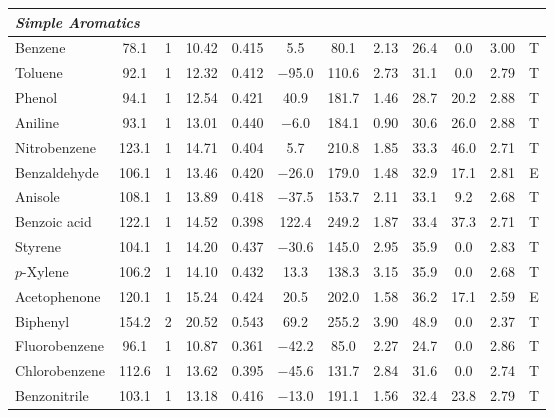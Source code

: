 \documentclass[12pt,a4paper]{article}
\begin{document}
\begin{small}
\begin{longtable}{@{}p{2.8cm}ccccccccccc@{}}
\multicolumn{12}{l}{\textit{\textbf{Simple Aromatics}}} \\
\midrule
Benzene & 78.1 & 1 & 10.42 & 0.415 & 5.5 & 80.1 & 2.13 & 26.4 & 0.0 & 3.00 & T \\
Toluene & 92.1 & 1 & 12.32 & 0.412 & $-$95.0 & 110.6 & 2.73 & 31.1 & 0.0 & 2.79 & T \\
Phenol & 94.1 & 1 & 12.54 & 0.421 & 40.9 & 181.7 & 1.46 & 28.7 & 20.2 & 2.88 & T \\
Aniline & 93.1 & 1 & 13.01 & 0.440 & $-$6.0 & 184.1 & 0.90 & 30.6 & 26.0 & 2.88 & T \\
Nitrobenzene & 123.1 & 1 & 14.71 & 0.404 & 5.7 & 210.8 & 1.85 & 33.3 & 46.0 & 2.71 & T \\
Benzaldehyde & 106.1 & 1 & 13.46 & 0.420 & $-$26.0 & 179.0 & 1.48 & 32.9 & 17.1 & 2.81 & E \\
Anisole & 108.1 & 1 & 13.89 & 0.418 & $-$37.5 & 153.7 & 2.11 & 33.1 & 9.2 & 2.68 & T \\
Benzoic acid & 122.1 & 1 & 14.52 & 0.398 & 122.4 & 249.2 & 1.87 & 33.4 & 37.3 & 2.71 & T \\
Styrene & 104.1 & 1 & 14.20 & 0.437 & $-$30.6 & 145.0 & 2.95 & 35.9 & 0.0 & 2.83 & T \\
$p$-Xylene & 106.2 & 1 & 14.10 & 0.432 & 13.3 & 138.3 & 3.15 & 35.9 & 0.0 & 2.68 & T \\
Acetophenone & 120.1 & 1 & 15.24 & 0.424 & 20.5 & 202.0 & 1.58 & 36.2 & 17.1 & 2.59 & E \\
Biphenyl & 154.2 & 2 & 20.52 & 0.543 & 69.2 & 255.2 & 3.90 & 48.9 & 0.0 & 2.37 & T \\
Fluorobenzene & 96.1 & 1 & 10.87 & 0.361 & $-$42.2 & 85.0 & 2.27 & 24.7 & 0.0 & 2.86 & T \\
Chlorobenzene & 112.6 & 1 & 13.62 & 0.395 & $-$45.6 & 131.7 & 2.84 & 31.6 & 0.0 & 2.74 & T \\
Benzonitrile & 103.1 & 1 & 13.18 & 0.416 & $-$13.0 & 191.1 & 1.56 & 32.4 & 23.8 & 2.79 & T \\


\end{longtable}
\end{small}
\end{document}

